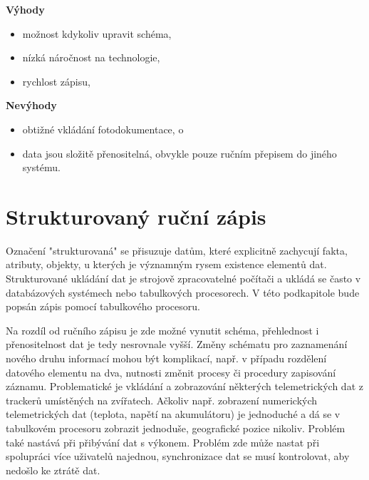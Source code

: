 \textbf{Výhody}

\begin{itemize}
	\item možnost kdykoliv upravit schéma,
	\item nízká náročnost na technologie,
	\item rychlost zápisu,
\end{itemize}

\textbf{Nevýhody}

\begin{itemize}
	\item obtižné vkládání fotodokumentace, o
	\item data jsou složitě přenositelná, obvykle pouze ručním přepisem do jiného systému.
\end{itemize}

\section{Strukturovaný ruční zápis}


Označení "strukturovaná" se přisuzuje datům, které explicitně zachycují fakta, atributy, objekty, u kterých je významným rysem existence elementů dat. Strukturované ukládání dat je strojově zpracovatelné počítači a ukládá se často v databázových systémech nebo tabulkových procesorech. V této podkapitole bude popsán zápis pomocí tabulkového procesoru.

Na rozdíl od ručního zápisu je zde možné vynutit schéma, přehlednost i přenositelnost dat je tedy nesrovnale vyšší. Změny schématu pro zaznamenání nového druhu informací mohou být komplikací, např. v případu rozdělení datového elementu na dva, nutnosti změnit procesy či procedury zapisování záznamu. Problematické je vkládání a zobrazování některých telemetrických dat z trackerů umístěných na zvířatech. Ačkoliv např. zobrazení numerických telemetrických dat (teplota, napětí na akumulátoru) je jednoduché a dá se v tabulkovém procesoru zobrazit jednoduše, geografické pozice nikoliv. Problém také nastává při přibývání dat s výkonem. Problém zde může nastat při spolupráci více uživatelů najednou, synchronizace dat se musí kontrolovat, aby nedošlo ke ztrátě dat.

